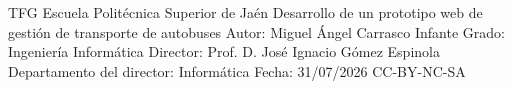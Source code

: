 \documentclass[a4paper,12pt,twoside,hidelinks,openany]{report}
\def\Estudiante{Miguel Ángel Carrasco Infante}
\def\TituloTFT{Desarrollo de un prototipo web de gestión de transporte de autobuses}
\def\Fecha{31/07/2026}
\begin{document}

\thispagestyle{empty}

\tfgPortada
{TFG} %
{Escuela Politécnica Superior de Jaén} %
{\TituloTFT} %
{Autor: \Estudiante}
{Grado: Ingeniería Informática}
{Director: Prof. D. José Ignacio Gómez Espinola} %
{Departamento del director: Informática}
{Fecha: \Fecha}
{CC-BY-NC-SA} %

\thispagestyle{empty}
\cleardoublepage
\newpage

\newpage
\thispagestyle{empty}

\thispagestyle{empty}
\cleardoublepage
\newpage
\thispagestyle{empty}

\thispagestyle{empty}
\cleardoublepage
\renewcommand{\contentsname}{Índice}
\tableofcontents

\setcounter{page}{1}












\nocite{*} 
\end{document}
